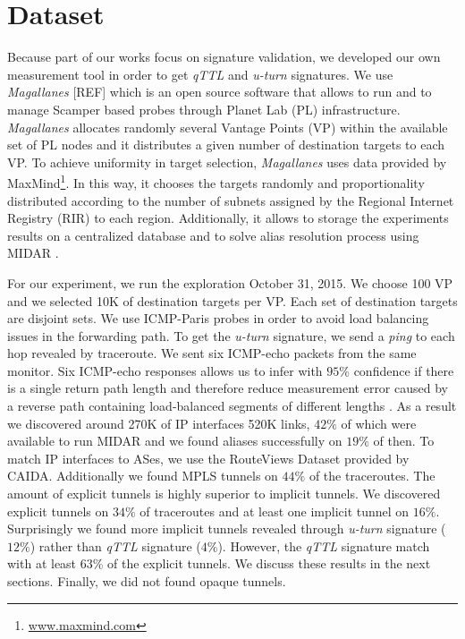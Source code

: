 \section{Dataset}\label{dataset}

Because part of our works focus on signature validation, we developed our own
measurement tool in order to get \textit{qTTL} and \textit{u-turn} signatures.
We use \textit{Magallanes} [REF] which is an open source software that allows
to run and to manage Scamper \cite{Luckie10} based probes through Planet Lab (PL) infrastructure. \textit{Magallanes}  allocates randomly several Vantage Points (VP) within the available set of PL nodes and it distributes a given number of destination  targets to each VP. To achieve uniformity in target selection,  \textit{Magallanes} uses data provided by MaxMind\footnote{\url{www.maxmind.com}}. In this way, it chooses the targets randomly and proportionality distributed according to the number of subnets assigned by the Regional
Internet Registry (RIR) to each region. Additionally, it allows to storage the experiments results on a centralized database and to solve alias resolution process using MIDAR \cite{Keys13}. 

For our experiment, we run the exploration October 31, 2015. We choose 100 VP and we selected 10K of destination targets per VP. Each set of destination targets are disjoint sets. We use ICMP-Paris probes  in order to avoid load balancing issues in
the forwarding path. To get the \textit{u-turn} signature, we send a
\textit{ping} to each hop revealed by traceroute. We sent six ICMP-echo packets
from the same monitor. Six ICMP-echo responses allows us to infer with $95\%$
confidence if there is a single return path length and therefore reduce
measurement error caused by a reverse path containing load-balanced segments of
different lengths \cite{BRICE07}. As a result we discovered around 270K of IP interfaces 520K links, $42\%$ of which were available to run MIDAR and we found aliases successfully on $19\%$ of then. To match IP interfaces to ASes, we use the RouteViews Dataset provided by CAIDA.  Additionally
we found MPLS tunnels on  $44\%$ of the traceroutes. The amount of explicit
tunnels is highly superior to implicit tunnels. We discovered explicit tunnels
on $34\%$ of traceroutes and at least one implicit tunnel on $16\%$.
Surprisingly we found more implicit tunnels revealed through \textit{u-turn}
signature ($12\%$) rather than \textit{qTTL} signature ($4\%$). However, the \textit{qTTL} signature match with at least $63\%$ of the explicit tunnels. We discuss these
results in the next sections. Finally, we did not found opaque tunnels.
